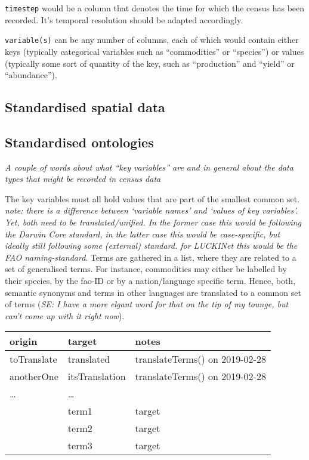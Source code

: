 \documentclass[12pt,]{article}
\begin{document}
\texttt{timestep} would be a column that denotes the time for which the census has been recorded. It's temporal resolution should be adapted accordingly.

\texttt{variable(s)} can be any number of columns, each of which would contain either keys (typically categorical variables such as ``commodities'' or ``species'') or values (typically some sort of quantity of the key, such as ``production'' and ``yield'' or ``abundance'').

\hypertarget{standardised-spatial-data}{%
\subsection{Standardised spatial data}\label{standardised-spatial-data}}

\hypertarget{standardised-ontologies}{%
\subsection{Standardised ontologies}\label{standardised-ontologies}}

\emph{A couple of words about what ``key variables'' are and in general about the data types that might be recorded in census data}

The key variables must all hold values that are part of the smallest common set.
\emph{note: there is a difference between `variable names' and `values of key variables'. Yet, both need to be translated/unified. In the former case this would be following the Darwin Core standard, in the latter case this would be case-specific, but ideally still following some (external) standard. for LUCKINet this would be the FAO naming-standard}.
Terms are gathered in a list, where they are related to a set of generalised terms.
For instance, commodities may either be labelled by their species, by the fao-ID or by a nation/language specific term.
Hence, both, semantic synonyms and terms in other languages are translated to a common set of terms (\emph{SE: I have a more elgant word for that on the tip of my tounge, but can't come up with it right now}).

\begin{longtable}[]{@{}lll@{}}
\toprule
origin & target & notes\tabularnewline
\midrule
\endhead
toTranslate & translated & translateTerms() on 2019-02-28\tabularnewline
anotherOne & itsTranslation & translateTerms() on 2019-02-28\tabularnewline
\ldots{} & \ldots{} &\tabularnewline
& term1 & target\tabularnewline
& term2 & target\tabularnewline
& term3 & target\tabularnewline
\bottomrule
\end{longtable}
\end{document}
